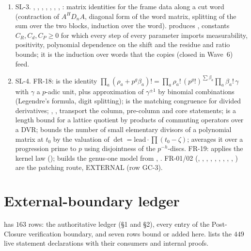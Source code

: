 \documentclass[10pt]{article}
\newcommand{\SL}[1]{\textsf{SL-#1}}
\begin{document}
\begin{enumerate}[nosep]
\item \SL{3}. , , , , , , , : matrix identities for the frame data along a cut word (contraction of $A^{H}D_nA$, diagonal form of the word matrix, splitting of the sum over the two blocks, induction over the word).  produces , constants $C_R,C_d,C_P\ge0$ for which every step of every parameter imports measurability, positivity, polynomial dependence on the shift and the residue and ratio bounds; it is the induction over words that the  copies (closed in Wave~6) feed.
\item \SL{4}. FR-18:  is the identity $\prod_a(\rho_a+p^g\beta_a)!=\prod_a\rho_a!\,(p^g!)^{\sum\beta_a}\prod_a\beta_a!\,\gamma$ with $\gamma$ a $p$-adic unit, plus approximation of $\gamma^{\pm1}$ by binomial combinations (Legendre's formula, digit splitting);  is the matching congruence for divided derivatives; , ,  transport the column, pre-column and core statements;  is a length bound for a lattice quotient by products of commuting operators over a DVR;  bounds the number of small elementary divisors of a polynomial matrix at $t_0$ by the valuation of $\det=\mathrm{lead}\cdot\prod(t_0-\zeta)$;  averages it over a progression prime to $p$ using disjointness of the $p^{-h}$-discs. FR-19:  applies the kernel law ();  builds the genus-one model from , . FR-01/02 (, , , , , , , , , ) are the patching route, EXTERNAL (row GC-3).
\end{enumerate}

\section{External-boundary ledger}\label{sec:ext}

 has $163$ rows: the authoritative ledger (\S1 and \S2), every entry of the Post-Closure verification boundary, and seven rows bound or added here.  lists the $449$ live  statement declarations with their consumers and internal proofs.
\end{document}
